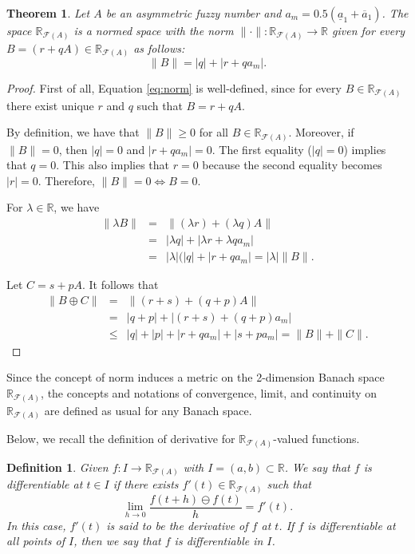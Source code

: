 \documentclass[12pt,a4paper]{article}
\newcommand{\RR}{\mathbb{R}}
\newcommand{\RFA}{\mathbb{R}_{\mathcal{F}(A)}}
\newtheorem{theorem}{Theorem}
\newtheorem{definition}{Definition}
\begin{document}
\begin{theorem}\label{thm:norm}
Let $A$ be an asymmetric fuzzy number and $a_m = 0.5(\underline{a}_1 + \overline{a}_1)$. The space $\RFA$ is a normed space with the norm $\| \cdot \|: \RFA \to \RR$ given for every $B = (r + qA) \in \RFA$ as follows:
\begin{equation}\label{eq:norm}
\|B\| = |q| + |r + qa_m|.    
\end{equation}
\end{theorem}
\begin{proof}
First of all, Equation \eqref{eq:norm} is well-defined, since for every $B \in \RFA$ there exist unique $r$ and $q$ such that $B = r + qA$. 

By definition, we have that $\|B\| \geq 0$ for all $B \in \RFA$. Moreover, if $\|B\| = 0$, then  
$|q|=0$ and $|r + qa_m| = 0$. The first equality ($|q|=0$) implies that $q=0$. This also implies that $r=0$ because the second equality becomes $|r| = 0$. Therefore, $\|B\| = 0 \Leftrightarrow B = 0$. 

For $\lambda \in \RR$, we have 
\begin{eqnarray*}
\| \lambda B \| & = & \| (\lambda r) + (\lambda q) A \| \\
 & = & |\lambda q| +  |\lambda r +  \lambda q a_m | \\
 & = & |\lambda|(|q| +  |r +  q a_m | = |\lambda|\|B\|.
\end{eqnarray*}

Let $C = s + pA$. It follows that 
\begin{eqnarray*}
\| B \oplus C \| & = & \| (r + s) + (q + p) A \| \\
 & = & |q + p| +  |(r + s) + (q + p) a_m | \\
 & \leq & |q| + |p| + |r + qa_m | + |s + pa_m| = \|B\| + \|C\|. 
\end{eqnarray*}
\end{proof}

Since the concept of norm induces a metric on the 2-dimension Banach space $\RFA$, the concepts and notations of convergence, limit, and continuity on $\RFA$ are defined as usual for any Banach space. 

Below, we recall the definition of derivative for $\RFA$-valued functions. 

\begin{definition}\label{def:derivative}
Given $f:I\to \RFA$ with $I=(a,b) \subset \RR$. We say that $f$ is differentiable at $t \in I$ if there exists $f'(t) \in \RFA$ such that 
\begin{equation}
 \lim_{h\to 0} \frac{f(t+h) \ominus f(t)}{h} = f'(t).   
\end{equation}
In this case, $f'(t)$ is said to be the derivative of $f$ at $t$. If $f$ is differentiable at all points of $I$, then we say that $f$ is differentiable in $I$. 
\end{definition}
\end{document}
